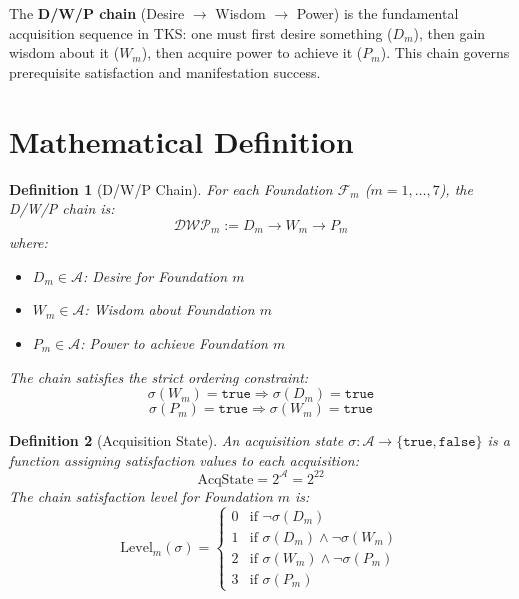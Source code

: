 \documentclass[11pt,twoside]{book}
\newcommand{\Foundations}{\mathcal{F}}
\newcommand{\Acquisitions}{\mathcal{A}}
\newcommand{\DWP}{\mathcal{DWP}}
\newtheorem{definition}{Definition}[chapter]
\begin{document}
\begin{tcolorbox}[colback=brown!5!white,colframe=brown!75!black,title=\textbf{Definition: D/W/P Chains},breakable]
The \textbf{D/W/P chain} (Desire $\to$ Wisdom $\to$ Power) is the fundamental
acquisition sequence in TKS: one must first desire something ($D_m$), then gain
wisdom about it ($W_m$), then acquire power to achieve it ($P_m$). This chain
governs prerequisite satisfaction and manifestation success.
\end{tcolorbox}

\section{Mathematical Definition}

\begin{definition}[D/W/P Chain]
\label{def:dwp-chain}
For each Foundation $\Foundations_m$ ($m = 1, \ldots, 7$), the \emph{D/W/P chain} is:
\[
    \DWP_m := D_m \to W_m \to P_m
\]
where:
\begin{itemize}
    \item $D_m \in \Acquisitions$: Desire for Foundation $m$
    \item $W_m \in \Acquisitions$: Wisdom about Foundation $m$
    \item $P_m \in \Acquisitions$: Power to achieve Foundation $m$
\end{itemize}
The chain satisfies the \emph{strict ordering constraint}:
\[
    \sigma(W_m) = \mathtt{true} \Rightarrow \sigma(D_m) = \mathtt{true}
\]
\[
    \sigma(P_m) = \mathtt{true} \Rightarrow \sigma(W_m) = \mathtt{true}
\]
\end{definition}

\begin{definition}[Acquisition State]
\label{def:acq-state}
An \emph{acquisition state} $\sigma : \Acquisitions \to \{\mathtt{true}, \mathtt{false}\}$
is a function assigning satisfaction values to each acquisition:
\[
    \mathrm{AcqState} = 2^{\Acquisitions} = 2^{22}
\]
The \emph{chain satisfaction level} for Foundation $m$ is:
\[
    \mathrm{Level}_m(\sigma) =
    \begin{cases}
        0 & \text{if } \neg\sigma(D_m) \\
        1 & \text{if } \sigma(D_m) \land \neg\sigma(W_m) \\
        2 & \text{if } \sigma(W_m) \land \neg\sigma(P_m) \\
        3 & \text{if } \sigma(P_m)
    \end{cases}
\]
\end{definition}
\end{document}
